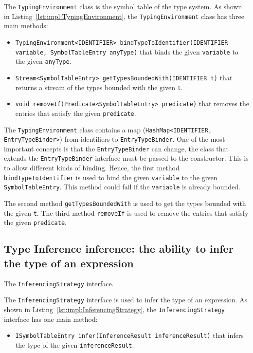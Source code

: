 The \texttt{TypingEnvironment} class is the symbol table of the type system. As shown in Listing~\ref{lst:impl:TypingEnvironment}, the \texttt{TypingEnvironment} class has three main methods:

\begin{itemize}
    \item \texttt{TypingEnvironment<IDENTIFIER> bindTypeToIdentifier(IDENTIFIER variable, SymbolTableEntry anyType)} that binds the given \texttt{variable} to the given \texttt{anyType}.
    \item \texttt{Stream<SymbolTableEntry> getTypesBoundedWith(IDENTIFIER t)} that returns a stream of the types bounded with the given \texttt{t}.
    \item \texttt{void removeIf(Predicate<SymbolTableEntry> predicate)} that removes the entries that satisfy the given \texttt{predicate}.
\end{itemize}

The \texttt{TypingEnvironment} class contains a map \linebreak (\texttt{HashMap<IDENTIFIER, EntryTypeBinder>}) from identifiers to \texttt{EntryTypeBinder}. One of the most important concepts is that the \texttt{EntryTypeBinder} can change, the class that extends the \texttt{EntryTypeBinder} interface must be passed to the constructor. This is to allow different kinds of binding.
Hence, the first method \texttt{bindTypeToIdentifier} is used to bind the given \texttt{variable} to the given \texttt{SymbolTableEntry}. This method could fail if the \texttt{variable} is already bounded.


The second method \texttt{getTypesBoundedWith} is used to get the types bounded with the given \texttt{t}. The third method \texttt{removeIf} is used to remove the entries that satisfy the given \texttt{predicate}.

\subsection{Type Inference inference: the ability to infer the type of an expression}\label{subsec:impl:TypeInference}

\begin{Listing}[tbh]
    \centering
    \caption{The \texttt{InferencingStrategy} interface.}
    \label{lst:impl:InferencingStrategy}
\end{Listing}

The \texttt{InferencingStrategy} interface is used to infer the type of an expression. As shown in Listing~\ref{lst:impl:InferencingStrategy}, the \texttt{InferencingStrategy} interface has one main method:
\begin{itemize}
    \item \texttt{ISymbolTableEntry infer(InferenceResult inferenceResult)} that infers the type of the given \texttt{inferenceResult}.
\end{itemize}

